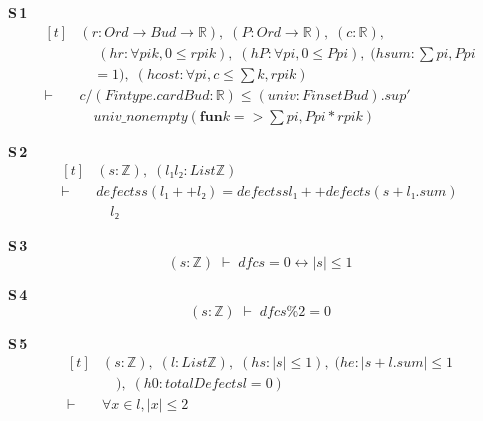 \noindent\textbf{S\,1}\quad{}
{\footnotesize\[ \begin{aligned}[t]
&(\mathit{r} : \mathit{Ord} \to \mathit{Bud} \to \mathbb{R} ),\; (\mathit{P} : \mathit{Ord} \to \mathbb{R} ),\; (\mathit{c} : \mathbb{R} ),\\
&\quad \; (\mathit{hr} : \forall \mathit{pi} \mathit{k}, 0 \leq \mathit{r} \mathit{pi} \mathit{k}),\; (\mathit{hP} : \forall \mathit{pi}, 0 \leq \mathit{P} \mathit{pi}),\; (\mathit{hsum} : \textstyle\sum \mathit{pi}, \mathit{P} \mathit{pi}\\
&\quad = 1),\; (\mathit{hcost} : \forall \mathit{pi}, \mathit{c} \leq \textstyle\sum \mathit{k}, \mathit{r} \mathit{pi} \mathit{k})\\
\vdash\;&\mathit{c} / (\mathit{Fintype}.\mathit{card} \mathit{Bud} : \mathbb{R} ) \leq (\mathit{univ} : \mathit{Finset} \mathit{Bud}).\mathit{sup'}\\
&\quad \mathit{univ\_nonempty} (\mathbf{fun} \mathit{k} => \textstyle\sum \mathit{pi}, \mathit{P} \mathit{pi} * \mathit{r} \mathit{pi} \mathit{k})
\end{aligned} \]}

\noindent\textbf{S\,2}\quad{}
{\footnotesize\[ \begin{aligned}[t]
&(\mathit{s} : \mathbb{Z} ),\; (\mathit{l₁} \mathit{l₂} : \mathit{List} \mathbb{Z} )\\
\vdash\;&\mathit{defects} \mathit{s} (\mathit{l₁} ++ \mathit{l₂}) = \mathit{defects} \mathit{s} \mathit{l₁} ++ \mathit{defects} (\mathit{s} + \mathit{l₁}.\mathit{sum})\\
&\quad \mathit{l₂}
\end{aligned} \]}

\noindent\textbf{S\,3}\quad{}
{\footnotesize\[ (\mathit{s} : \mathbb{Z} ) \;\vdash\; \mathit{dfc} \mathit{s} = 0 \leftrightarrow |\mathit{s}| \leq 1 \]}

\noindent\textbf{S\,4}\quad{}
{\footnotesize\[ (\mathit{s} : \mathbb{Z} ) \;\vdash\; \mathit{dfc} \mathit{s} \% 2 = 0 \]}

\noindent\textbf{S\,5}\quad{}
{\footnotesize\[ \begin{aligned}[t]
&(\mathit{s} : \mathbb{Z} ),\; (\mathit{l} : \mathit{List} \mathbb{Z} ),\; (\mathit{hs} : |\mathit{s}| \leq 1),\; (\mathit{he} : |\mathit{s} + \mathit{l}.\mathit{sum}| \leq 1\\
&\quad ),\; (\mathit{h0} : \mathit{totalDefect} \mathit{s} \mathit{l} = 0)\\
\vdash\;&\forall \mathit{x} \in \mathit{l}, |\mathit{x}| \leq 2
\end{aligned} \]}

